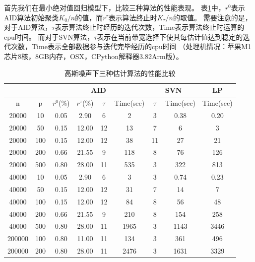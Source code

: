 首先我们在最小绝对值回归模型下，比较三种算法的性能表现。
表\ref{tab-performance}中，$r^0$表示AID算法初始聚类$K_0/n$的值，而$r^\tau$表示算法终止时$K_\tau/n$的取值。
需要注意的是，对于AID算法，$\tau$表示算法终止时经历的迭代次数，Time表示算法终止时运算的cpu时间。
而对于SVN算法，$\tau$表示在当前带宽选择下使其每估计值达到稳定的迭代次数，Time表示全部数据参与迭代完毕经历的cpu时间
（处理机情况：苹果M1芯片8核，8GB内存，OSX，CPython解释器3.82Arm版）。
\begin{table}[H]
    \small
    \caption{\small 高斯噪声下三种估计算法的性能比较}
    \label{tab-performance}
    \centering
    \begin{tabular}{@{}ccccccccc@{}}
    \toprule
           &     & \multicolumn{4}{c}{AID}        & \multicolumn{2}{c}{SVN} & LP        \\ \midrule
    n      & p   & $r^0$(\%) & $r^\tau$(\%) & $\tau$  & Time(sec) & $\tau$      & Time(sec)      & Time(sec) \\ \midrule
    20000  & 10  & 0.05  & 2.90  & 6  & 2         &  3      &         0.38       & 0.20      \\
    20000  & 50 & 0.15  & 12.00 & 12 & 13        &   7     &          6     & 3       \\
    20000  & 100 & 0.15  & 12.00 & 12 & 38        &  11      &         27    & 21         \\
    20000  & 200 & 0.66  & 21.55 & 9  & 118        &   8     &          76      & 126        \\
    20000  & 500 & 0.80  & 28.00 & 11 &  535      &  3      &              322  &     813 \\ 
    40000  & 10  & 0.05  & 2.90  & 6  & 3        &  3      &         0.74      & 0.23     \\
    40000  & 50 & 0.15  & 12.00 & 12 & 31        &   7     &          14     & 7       \\
    40000  & 100 & 0.15  & 12.00 & 12 & 84       &  8      &         56    & 48         \\
    40000  & 200 & 0.66  & 21.55 & 9  & 210        &   8     &          154     & 258        \\
    40000  & 500 & 0.80  & 28.00 & 11 & 1965       &  3      &             1143   &  3446      \\ 
    200000  & 100 & 0.80  & 11.00 & 11 & 134       &  3      &          361      &   496     \\ 
    200000  & 200 & 0.80  & 28.00 & 11 & 2476       &  3      &          1631      &   3329     \\ 
    \bottomrule
    \end{tabular}
\end{table}

